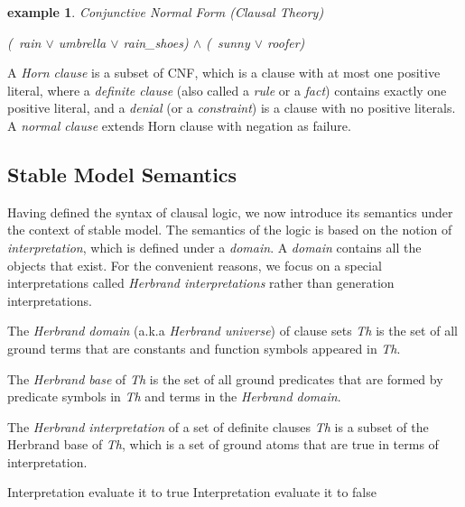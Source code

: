 \documentclass[12pt,twoside]{report}
\newtheorem{examp}{example}[section]
\begin{document}
\begin{examp} \normalfont Conjunctive Normal Form (Clausal Theory)
\begin{center}
 \textit{(~rain $\vee$ umbrella $\vee$ rain\_shoes) $\wedge$ (~sunny $\vee$ roofer)}
\end{center}
\end{examp}

A \textit{Horn clause} is a subset of CNF, which is a clause with at most one positive literal, where a \textit{definite clause} (also called a \textit{rule} or a \textit{fact}) contains exactly one positive literal, and a \textit{denial} (or a \textit{constraint}) is a clause with no positive literals.
A \textit{normal clause} extends Horn clause with negation as failure. 
\\

\subsection{Stable Model Semantics}

Having defined the syntax of clausal logic, we now introduce its semantics under the context of stable model. The semantics of the logic is based on the notion of \textit{interpretation}, which is defined under a \textit{domain}. A \textit{domain} contains all the objects that exist.  For the convenient reasons, we focus on a special interpretations called \textit{Herbrand interpretations} rather than generation interpretations. 

The \textit{Herbrand domain} (a.k.a \textit{Herbrand universe}) of clause sets \textit{Th} is the set of all ground terms that are constants and function symbols appeared in \textit{Th}.

The \textit{Herbrand base} of \textit{Th} is the set of all ground predicates that are formed by predicate symbols in \textit{Th} and terms in the \textit{Herbrand domain}.

The \textit{Herbrand interpretation} of a set of definite clauses \textit{Th} is a subset of the Herbrand base of \textit{Th}, which is a set of ground atoms that are true in terms of interpretation.

Interpretation evaluate it to true
Interpretation evaluate it to false
\end{document}
